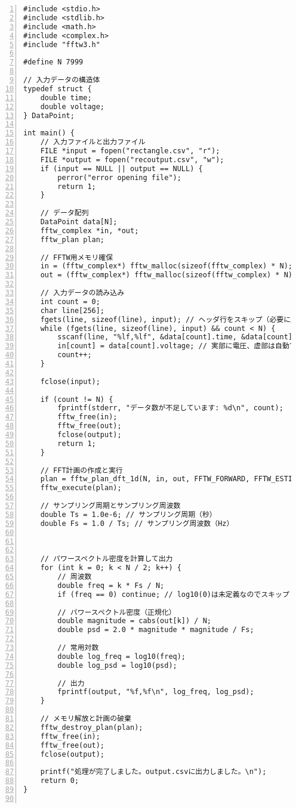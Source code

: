    \begin{Verbatim}[numbers=left, xleftmargin=10mm, numbersep=6pt,
        fontsize=\small, baselinestretch=0.8]
#include <stdio.h>
#include <stdlib.h>
#include <math.h>
#include <complex.h>
#include "fftw3.h"

#define N 7999

// 入力データの構造体
typedef struct {
    double time;
    double voltage;
} DataPoint;

int main() {
    // 入力ファイルと出力ファイル
    FILE *input = fopen("rectangle.csv", "r");
    FILE *output = fopen("recoutput.csv", "w");
    if (input == NULL || output == NULL) {
        perror("error opening file");
        return 1;
    }

    // データ配列
    DataPoint data[N];
    fftw_complex *in, *out;
    fftw_plan plan;

    // FFTW用メモリ確保
    in = (fftw_complex*) fftw_malloc(sizeof(fftw_complex) * N);
    out = (fftw_complex*) fftw_malloc(sizeof(fftw_complex) * N);

    // 入力データの読み込み
    int count = 0;
    char line[256];
    fgets(line, sizeof(line), input); // ヘッダ行をスキップ（必要に応じて）
    while (fgets(line, sizeof(line), input) && count < N) {
        sscanf(line, "%lf,%lf", &data[count].time, &data[count].voltage);
        in[count] = data[count].voltage; // 実部に電圧、虚部は自動で0
        count++;
    }

    fclose(input);

    if (count != N) {
        fprintf(stderr, "データ数が不足しています: %d\n", count);
        fftw_free(in);
        fftw_free(out);
        fclose(output);
        return 1;
    }

    // FFT計画の作成と実行
    plan = fftw_plan_dft_1d(N, in, out, FFTW_FORWARD, FFTW_ESTIMATE);
    fftw_execute(plan);

    // サンプリング周期とサンプリング周波数
    double Ts = 1.0e-6; // サンプリング周期（秒）
    double Fs = 1.0 / Ts; // サンプリング周波数（Hz）



    // パワースペクトル密度を計算して出力
    for (int k = 0; k < N / 2; k++) {
        // 周波数
        double freq = k * Fs / N;
        if (freq == 0) continue; // log10(0)は未定義なのでスキップ

        // パワースペクトル密度（正規化）
        double magnitude = cabs(out[k]) / N;
        double psd = 2.0 * magnitude * magnitude / Fs;

        // 常用対数
        double log_freq = log10(freq);
        double log_psd = log10(psd);

        // 出力
        fprintf(output, "%f,%f\n", log_freq, log_psd);
    }

    // メモリ解放と計画の破棄
    fftw_destroy_plan(plan);
    fftw_free(in);
    fftw_free(out);
    fclose(output);

    printf("処理が完了しました。output.csvに出力しました。\n");
    return 0;
}


    \end{Verbatim}



